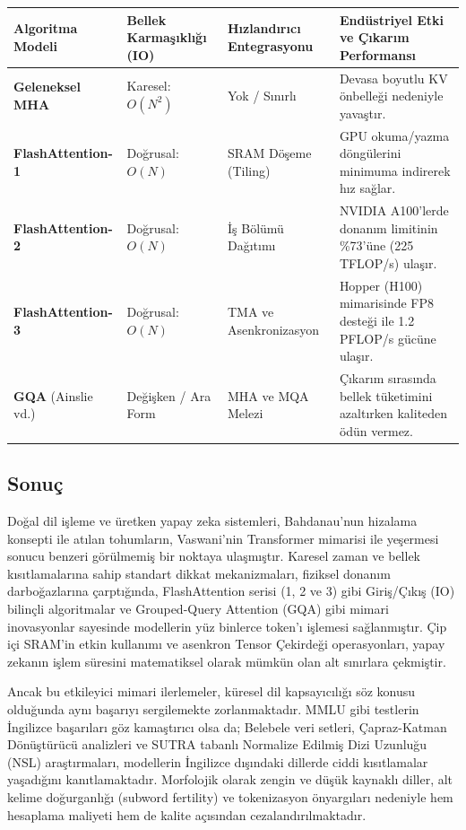 \documentclass[11pt,a4paper]{article}
\begin{document}
\begin{longtable}{>{\raggedright\arraybackslash}p{}>{\raggedright\arraybackslash}p{}>{\raggedright\arraybackslash}p{}>{\raggedright\arraybackslash}p{}}
\toprule
\textbf{Algoritma Modeli} & \textbf{Bellek Karmaşıklığı (IO)} & \textbf{Hızlandırıcı Entegrasyonu} & \textbf{Endüstriyel Etki ve Çıkarım Performansı} \\
\midrule
\endhead
\textbf{Geleneksel MHA} & Karesel: \(O(N^2)\) & Yok / Sınırlı & Devasa boyutlu KV önbelleği nedeniyle yavaştır. \\
\textbf{FlashAttention-1} & Doğrusal: \(O(N)\) & SRAM Döşeme (Tiling) & GPU okuma/yazma döngülerini minimuma indirerek hız sağlar. \\
\textbf{FlashAttention-2} & Doğrusal: \(O(N)\) & İş Bölümü Dağıtımı & NVIDIA A100'lerde donanım limitinin \%73'üne (225 TFLOP/s) ulaşır. \\
\textbf{FlashAttention-3} & Doğrusal: \(O(N)\) & TMA ve Asenkronizasyon & Hopper (H100) mimarisinde FP8 desteği ile 1.2 PFLOP/s gücüne ulaşır. \\
\textbf{GQA} (Ainslie vd.) & Değişken / Ara Form & MHA ve MQA Melezi & Çıkarım sırasında bellek tüketimini azaltırken kaliteden ödün vermez. \\
\bottomrule
\end{longtable}
\subsection{Sonuç}
Doğal dil işleme ve üretken yapay zeka sistemleri, Bahdanau'nun hizalama konsepti ile atılan tohumların, Vaswani'nin Transformer mimarisi ile yeşermesi sonucu benzeri görülmemiş bir noktaya ulaşmıştır. Karesel zaman ve bellek kısıtlamalarına sahip standart dikkat mekanizmaları, fiziksel donanım darboğazlarına çarptığında, FlashAttention serisi (1, 2 ve 3) gibi Giriş/Çıkış (IO) bilinçli algoritmalar ve Grouped-Query Attention (GQA) gibi mimari inovasyonlar sayesinde modellerin yüz binlerce token'ı işlemesi sağlanmıştır. Çip içi SRAM'in etkin kullanımı ve asenkron Tensor Çekirdeği operasyonları, yapay zekanın işlem süresini matematiksel olarak mümkün olan alt sınırlara çekmiştir.

Ancak bu etkileyici mimari ilerlemeler, küresel dil kapsayıcılığı söz konusu olduğunda aynı başarıyı sergilemekte zorlanmaktadır. MMLU gibi testlerin İngilizce başarıları göz kamaştırıcı olsa da; Belebele veri setleri, Çapraz-Katman Dönüştürücü analizleri ve SUTRA tabanlı Normalize Edilmiş Dizi Uzunluğu (NSL) araştırmaları, modellerin İngilizce dışındaki dillerde ciddi kısıtlamalar yaşadığını kanıtlamaktadır. Morfolojik olarak zengin ve düşük kaynaklı diller, alt kelime doğurganlığı (subword fertility) ve tokenizasyon önyargıları nedeniyle hem hesaplama maliyeti hem de kalite açısından cezalandırılmaktadır.
\end{document}

